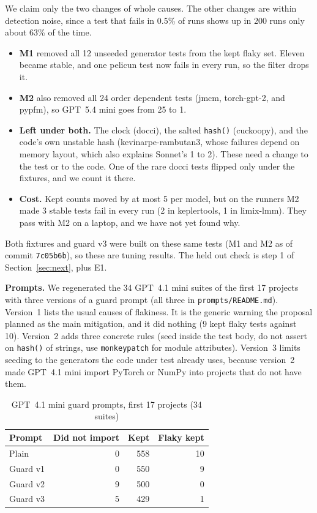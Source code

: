 \documentclass[sigconf,nonacm]{acmart}
\begin{document}
We claim only the two changes of whole causes. The other changes are within detection noise, since a test that fails in 0.5\% of runs shows up in 200 runs only about 63\% of the time.
\begin{itemize}
\item \textbf{M1} removed all 12 unseeded generator tests from the kept flaky set. Eleven became stable, and one pelicun test now fails in every run, so the filter drops it.
\item \textbf{M2} also removed all 24 order dependent tests (jmcm, torch-gpt-2, and pypfm), so GPT~5.4 mini goes from 25 to 1.
\item \textbf{Left under both.} The clock (docci), the salted \texttt{hash()} (cuckoopy), and the code's own unstable hash (kevinarpe-rambutan3, whose failures depend on memory layout, which also explains Sonnet's 1 to 2). These need a change to the test or to the code. One of the rare docci tests flipped only under the fixtures, and we count it there.
\item \textbf{Cost.} Kept counts moved by at most 5 per model, but on the runners M2 made 3 stable tests fail in every run (2 in keplertools, 1 in limix-lmm). They pass with M2 on a laptop, and we have not yet found why.
\end{itemize}
Both fixtures and guard v3 were built on these same tests (M1 and M2 as of commit \texttt{7c05b6b}), so these are tuning results. The held out check is step 1 of Section~\ref{sec:next}, plus E1.

\textbf{Prompts.} We regenerated the 34 GPT~4.1 mini suites of the first 17 projects with three versions of a guard prompt (all three in \texttt{prompts/README.md}). Version~1 lists the usual causes of flakiness. It is the generic warning the proposal planned as the main mitigation, and it did nothing (9 kept flaky tests against 10). Version~2 adds three concrete rules (seed inside the test body, do not assert on \texttt{hash()} of strings, use \texttt{monkeypatch} for module attributes). Version~3 limits seeding to the generators the code under test already uses, because version~2 made GPT~4.1 mini import PyTorch or NumPy into projects that do not have them.

\begin{table}[h]
\caption{GPT~4.1 mini guard prompts, first 17 projects (34 suites)}
\label{tab:guard}
\small
\setlength{\tabcolsep}{4pt}
\begin{tabularx}{\columnwidth}{Xrrr}
\toprule
Prompt & Did not import & Kept & Flaky kept \\
\midrule
Plain & 0 & 558 & 10 \\
Guard v1 & 0 & 550 & 9 \\
Guard v2 & 9 & 500 & 0 \\
Guard v3 & 5 & 429 & 1 \\
\bottomrule
\end{tabularx}
\end{table}
\end{document}
